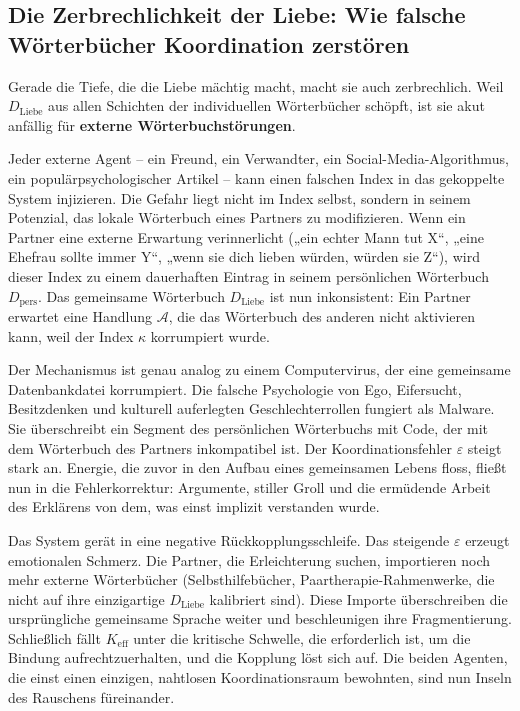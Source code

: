 \documentclass[12pt,a4paper]{article}
\begin{document}
	\subsection{Die Zerbrechlichkeit der Liebe: Wie falsche Wörterbücher Koordination zerstören}
	
	Gerade die Tiefe, die die Liebe mächtig macht, macht sie auch zerbrechlich. Weil \(D_{\text{Liebe}}\) aus allen Schichten der individuellen Wörterbücher schöpft, ist sie akut anfällig für \textbf{externe Wörterbuchstörungen}.
	
	Jeder externe Agent – ein Freund, ein Verwandter, ein Social-Media-Algorithmus, ein populärpsychologischer Artikel – kann einen falschen Index in das gekoppelte System injizieren. Die Gefahr liegt nicht im Index selbst, sondern in seinem Potenzial, das lokale Wörterbuch eines Partners zu modifizieren. Wenn ein Partner eine externe Erwartung verinnerlicht („ein echter Mann tut X“, „eine Ehefrau sollte immer Y“, „wenn sie dich lieben würden, würden sie Z“), wird dieser Index zu einem dauerhaften Eintrag in seinem persönlichen Wörterbuch \(D_{\text{pers}}\). Das gemeinsame Wörterbuch \(D_{\text{Liebe}}\) ist nun inkonsistent: Ein Partner erwartet eine Handlung \(\mathcal{A}\), die das Wörterbuch des anderen nicht aktivieren kann, weil der Index \(\kappa\) korrumpiert wurde.
	
	Der Mechanismus ist genau analog zu einem Computervirus, der eine gemeinsame Datenbankdatei korrumpiert. Die falsche Psychologie von Ego, Eifersucht, Besitzdenken und kulturell auferlegten Geschlechterrollen fungiert als Malware. Sie überschreibt ein Segment des persönlichen Wörterbuchs mit Code, der mit dem Wörterbuch des Partners inkompatibel ist. Der Koordinationsfehler \(\varepsilon\) steigt stark an. Energie, die zuvor in den Aufbau eines gemeinsamen Lebens floss, fließt nun in die Fehlerkorrektur: Argumente, stiller Groll und die ermüdende Arbeit des Erklärens von dem, was einst implizit verstanden wurde.
	
	Das System gerät in eine negative Rückkopplungsschleife. Das steigende \(\varepsilon\) erzeugt emotionalen Schmerz. Die Partner, die Erleichterung suchen, importieren noch mehr externe Wörterbücher (Selbsthilfebücher, Paartherapie-Rahmenwerke, die nicht auf ihre einzigartige \(D_{\text{Liebe}}\) kalibriert sind). Diese Importe überschreiben die ursprüngliche gemeinsame Sprache weiter und beschleunigen ihre Fragmentierung. Schließlich fällt \(K_{\mathrm{eff}}\) unter die kritische Schwelle, die erforderlich ist, um die Bindung aufrechtzuerhalten, und die Kopplung löst sich auf. Die beiden Agenten, die einst einen einzigen, nahtlosen Koordinationsraum bewohnten, sind nun Inseln des Rauschens füreinander.
	
\end{document}
